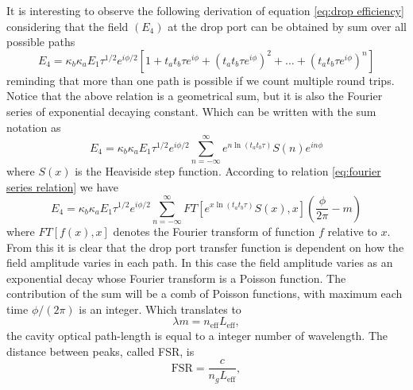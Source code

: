 \documentclass[12pt,twoside,english]{book}
\renewcommand{\~}{\perispomeni}%
\numberwithin{equation}{section}
\numberwithin{figure}{section}
\begin{document}
It is interesting to observe the following derivation of equation \ref{eq:drop efficiency} considering that the field $(E_4)$ at the drop port can be obtained by sum over all possible paths
\begin{equation}
E_{4}=\kappa_{b}\kappa_{a}E_{1}\tau^{1/2}e^{i\phi/2}\left[1+t_{a}t_{b}\tau e^{i\phi}+\left(t_{a}t_{b}\tau e^{i\phi}\right)^{2}+\dots+\left(t_{a}t_{b}\tau e^{i\phi}\right)^{n}\right]
\end{equation}
reminding that more than one path is possible if we count multiple round trips. Notice that the above relation is a geometrical sum, but it is also the Fourier series of  exponential decaying constant. Which can be written with the sum notation as
\begin{equation}
E_{4}=\kappa_{b}\kappa_{a}E_{1}\tau^{1/2}e^{i\phi/2}\sum_{n=-\infty}^{\infty}e^{n\ln\left(t_{a}t_{b}\tau\right)}S\left(n\right)e^{in\phi}
\end{equation}
where $S\left(x\right)$ is the Heaviside step function. According to relation \ref{eq:fourier series relation} we have
\begin{equation}
E_{4}=\kappa_{b}\kappa_{a}E_{1}\tau^{1/2}e^{i\phi/2}\sum_{n=-\infty}^{\infty}FT\left[e^{x\ln\left(t_{a}t_{b}\tau\right)}S\left(x\right),x\right]\left(\frac{\phi}{2\pi}-m\right)
\end{equation}
where $FT\left[f\left(x\right),x\right]$ denotes the Fourier transform of function $f$ relative to $x$. From this it is clear that the drop port transfer function is dependent on how the field amplitude varies in each path. In this case the field amplitude varies as an exponential decay whose Fourier transform is a Poisson function. The contribution of the sum will be a comb of Poisson functions, with maximum each time $\phi/\left(2\pi\right)$ is an integer. Which translates to
\begin{equation}
\lambda m = n_{\text{eff}}L_{\text{eff}},
\end{equation}
the cavity optical path-length is equal to a integer number of wavelength. The distance between peaks, called \gls{FSR}, is
\begin{equation}
\text{FSR} = \frac{c}{n_g L_{\text{eff}}},
\end{equation}
 
\end{document}
